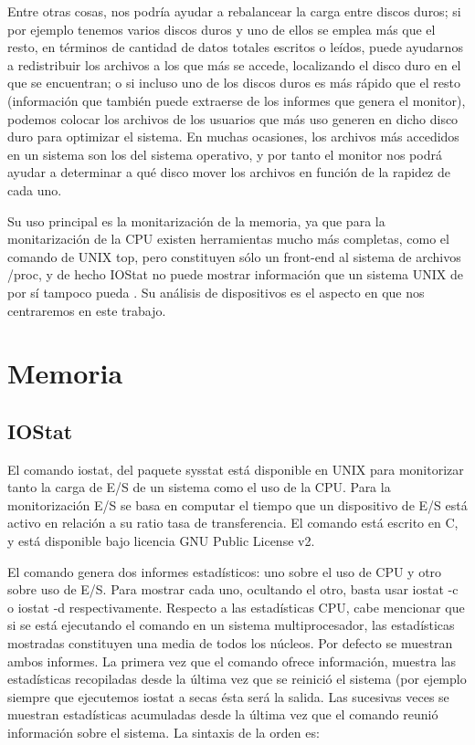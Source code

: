 \documentclass[a4paper,10pt]{article}
\renewcommand{\texttt}[2][black!60]{\textcolor{#1}{\ttfamily #2}}
\begin{document}
Entre otras cosas, nos podría ayudar a rebalancear
la carga entre discos duros; si por ejemplo tenemos varios discos duros y uno de ellos se emplea más que el resto, en términos
de cantidad de datos totales escritos o leídos, puede ayudarnos a redistribuir los archivos a los que más se accede, localizando
el disco duro en el que se encuentran; o si incluso uno de los discos duros es más rápido que el resto (información que 
también puede extraerse de los informes que genera el monitor), podemos colocar los archivos de los usuarios que más uso generen en dicho
disco duro para optimizar el sistema. 
En muchas ocasiones, los archivos más accedidos en un sistema son los del sistema operativo, y por tanto el monitor nos podrá
ayudar a determinar a qué disco mover los archivos en función de la rapidez de cada uno. \cite{merelo}

Su uso principal es la monitarización de la memoria, ya que para la monitarización de la CPU existen herramientas mucho más
completas, como el comando de UNIX \texttt{top}, pero constituyen sólo  un front-end al sistema de archivos \texttt{/proc}, y de hecho
IOStat no puede mostrar información que un sistema UNIX de por sí tampoco pueda \cite{readme}. Su análisis de dispositivos es el aspecto en
que nos centraremos en este trabajo.

\section{Memoria}
\subsection{IOStat \cite{maniostat}}
El comando \texttt{iostat}, del paquete \texttt{sysstat} está disponible en UNIX para monitorizar tanto la carga de E/S de un sistema como el uso de la CPU. Para la monitorización E/S se basa en computar el tiempo que un dispositivo de E/S está activo en 
relación a su ratio tasa de transferencia. El comando está escrito en C, y está disponible bajo licencia GNU Public License v2.

El comando genera dos informes estadísticos: uno sobre el uso de CPU y otro sobre uso de E/S. Para mostrar cada uno, ocultando
el otro, basta usar \texttt{iostat -c} o \texttt{iostat -d} respectivamente. Respecto a las estadísticas CPU, cabe mencionar
que si se está ejecutando el comando en un sistema multiprocesador, las estadísticas mostradas constituyen una media de todos
los núcleos. Por defecto se muestran ambos informes. La primera vez que el comando ofrece información, muestra las estadísticas 
recopiladas desde la última vez que se reinició el sistema (por ejemplo siempre que ejecutemos \texttt{iostat} a secas ésta será
la salida. Las sucesivas veces se muestran estadísticas acumuladas desde la
última vez que el comando reunió información sobre el sistema. La sintaxis de la orden es:
\end{document}
